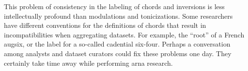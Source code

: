 
This problem of consistency in the labeling of chords and
inversions is less intellectually profound than modulations
and tonicizations. Some researchers have different
conventions for the definitions of chords that result in
incompatibilities when aggregating datasets. For example,
the ``root'' of a French \gls{augsix}, or the label for a
so-called cadential six-four. Perhaps a conversation among
analysts and dataset curators could fix these problems one
day. They certainly take time away while performing
\gls{arna} research.

